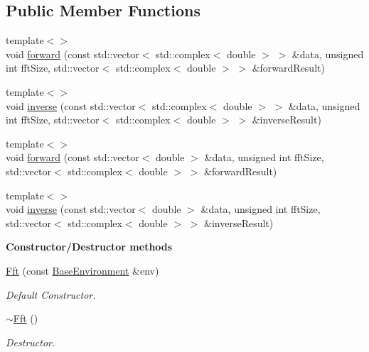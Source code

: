 \subsection*{Public Member Functions}
\begin{DoxyCompactItemize}
\item 
{\footnotesize template$<$$>$ }\\void \hyperlink{class_q_u_e_s_o_1_1_fft_a749f7de2d358417a63e6060b96c5233b}{forward} (const std\-::vector$<$ std\-::complex$<$ double $>$ $>$ \&data, unsigned int fft\-Size, std\-::vector$<$ std\-::complex$<$ double $>$ $>$ \&forward\-Result)
\item 
{\footnotesize template$<$$>$ }\\void \hyperlink{class_q_u_e_s_o_1_1_fft_ab7147b1d0ec73019152c149e602172f1}{inverse} (const std\-::vector$<$ std\-::complex$<$ double $>$ $>$ \&data, unsigned int fft\-Size, std\-::vector$<$ std\-::complex$<$ double $>$ $>$ \&inverse\-Result)
\item 
{\footnotesize template$<$$>$ }\\void \hyperlink{class_q_u_e_s_o_1_1_fft_ab31ecb8b49b52d107f152fa07a59628d}{forward} (const std\-::vector$<$ double $>$ \&data, unsigned int fft\-Size, std\-::vector$<$ std\-::complex$<$ double $>$ $>$ \&forward\-Result)
\item 
{\footnotesize template$<$$>$ }\\void \hyperlink{class_q_u_e_s_o_1_1_fft_aed1cacf899ad52ae979c475130411719}{inverse} (const std\-::vector$<$ double $>$ \&data, unsigned int fft\-Size, std\-::vector$<$ std\-::complex$<$ double $>$ $>$ \&inverse\-Result)
\end{DoxyCompactItemize}
\begin{Indent}{\bf Constructor/\-Destructor methods}\par
\begin{DoxyCompactItemize}
\item 
\hyperlink{class_q_u_e_s_o_1_1_fft_a04fa27a65066c50e029c842fa1e3fe78}{Fft} (const \hyperlink{class_q_u_e_s_o_1_1_base_environment}{Base\-Environment} \&env)
\begin{DoxyCompactList}\small\item\em Default Constructor. \end{DoxyCompactList}\item 
\hyperlink{class_q_u_e_s_o_1_1_fft_a3dac972e69f606d201dee17db1e9216b}{$\sim$\-Fft} ()
\begin{DoxyCompactList}\small\item\em Destructor. \end{DoxyCompactList}\end{DoxyCompactItemize}
\end{Indent}
